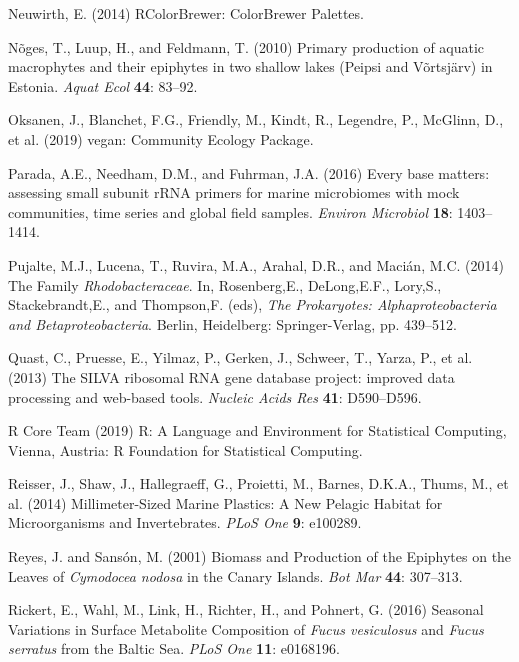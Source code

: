 \documentclass[12pt,]{article}
\begin{document}
\leavevmode\hypertarget{ref-Neuwirth2014}{}%
Neuwirth, E. (2014) RColorBrewer: ColorBrewer Palettes.

\leavevmode\hypertarget{ref-Noges2010}{}%
Nõges, T., Luup, H., and Feldmann, T. (2010) Primary production of
aquatic macrophytes and their epiphytes in two shallow lakes (Peipsi and
Võrtsjärv) in Estonia. \emph{Aquat Ecol} \textbf{44}: 83--92.

\leavevmode\hypertarget{ref-Oksanen2019}{}%
Oksanen, J., Blanchet, F.G., Friendly, M., Kindt, R., Legendre, P.,
McGlinn, D., et al. (2019) vegan: Community Ecology Package.

\leavevmode\hypertarget{ref-Parada2016}{}%
Parada, A.E., Needham, D.M., and Fuhrman, J.A. (2016) Every base
matters: assessing small subunit rRNA primers for marine microbiomes
with mock communities, time series and global field samples.
\emph{Environ Microbiol} \textbf{18}: 1403--1414.

\leavevmode\hypertarget{ref-Pujalte2014}{}%
Pujalte, M.J., Lucena, T., Ruvira, M.A., Arahal, D.R., and Macián, M.C.
(2014) The Family \emph{Rhodobacteraceae}. In, Rosenberg,E.,
DeLong,E.F., Lory,S., Stackebrandt,E., and Thompson,F. (eds), \emph{The
Prokaryotes: Alphaproteobacteria and Betaproteobacteria}. Berlin,
Heidelberg: Springer-Verlag, pp. 439--512.

\leavevmode\hypertarget{ref-Quast2013}{}%
Quast, C., Pruesse, E., Yilmaz, P., Gerken, J., Schweer, T., Yarza, P.,
et al. (2013) The SILVA ribosomal RNA gene database project: improved
data processing and web-based tools. \emph{Nucleic Acids Res}
\textbf{41}: D590--D596.

\leavevmode\hypertarget{ref-RCoreTeam2019}{}%
R Core Team (2019) R: A Language and Environment for Statistical
Computing, Vienna, Austria: R Foundation for Statistical Computing.

\leavevmode\hypertarget{ref-Reisser2014}{}%
Reisser, J., Shaw, J., Hallegraeff, G., Proietti, M., Barnes, D.K.A.,
Thums, M., et al. (2014) Millimeter-Sized Marine Plastics: A New Pelagic
Habitat for Microorganisms and Invertebrates. \emph{PLoS One}
\textbf{9}: e100289.

\leavevmode\hypertarget{ref-Reyes2001}{}%
Reyes, J. and Sansón, M. (2001) Biomass and Production of the Epiphytes
on the Leaves of \emph{Cymodocea nodosa} in the Canary Islands.
\emph{Bot Mar} \textbf{44}: 307--313.

\leavevmode\hypertarget{ref-Rickert2016}{}%
Rickert, E., Wahl, M., Link, H., Richter, H., and Pohnert, G. (2016)
Seasonal Variations in Surface Metabolite Composition of \emph{Fucus
vesiculosus} and \emph{Fucus serratus} from the Baltic Sea. \emph{PLoS
One} \textbf{11}: e0168196.
\end{document}
